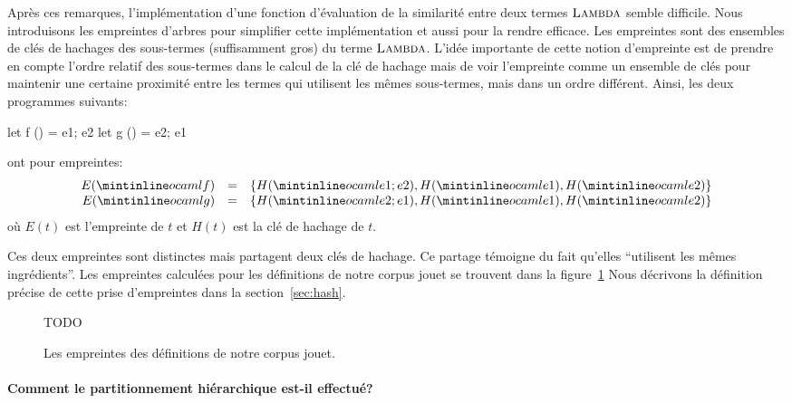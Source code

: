 Après ces remarques, l'implémentation d'une fonction d'évaluation de
la similarité entre deux termes $\textsc{Lambda}$ semble difficile. Nous
introduisons les empreintes d'arbres pour simplifier cette
implémentation et aussi pour la rendre efficace. Les empreintes sont
des ensembles de clés de hachages des sous-termes (suffisamment gros)
du terme $\textsc{Lambda}$. L'idée importante de cette notion d'empreinte
est de prendre en compte l'ordre relatif des sous-termes dans le
calcul de la clé de hachage mais de voir l'empreinte comme un ensemble
de clés pour maintenir une certaine proximité entre les termes qui
utilisent les mêmes sous-termes, mais dans un ordre différent. Ainsi,
les deux programmes suivants:
\begin{ocaml}
let f () = e1; e2
let g () = e2; e1
\end{ocaml}
\noindent ont pour empreintes:
\[
\begin{array}{rcl}
E(\iocaml{f}) &=& \{ H(\iocaml{e1; e2}), H(\iocaml{e1}), H(\iocaml{e2}) \} \\
E(\iocaml{g}) &=& \{ H(\iocaml{e2; e1}), H(\iocaml{e1}), H(\iocaml{e2}) \}
\end{array}
\]
\noindent où $E(t)$ est l'empreinte de $t$ et $H(t)$ est la clé de hachage de $t$.

Ces deux empreintes sont distinctes mais partagent deux clés de
hachage. Ce partage témoigne du fait qu'elles ``utilisent les mêmes
ingrédients''. Les empreintes calculées pour les définitions de notre
corpus jouet se trouvent dans la figure~\ref{fig:hash} Nous décrivons
la définition précise de cette prise d'empreintes dans la
section~\ref{sec:hash}.

\begin{figure}
TODO
\caption{Les empreintes des définitions de notre corpus jouet.}
\label{fig:hash}
\end{figure}

\paragraph{Comment le partitionnement hiérarchique est-il effectué?}
